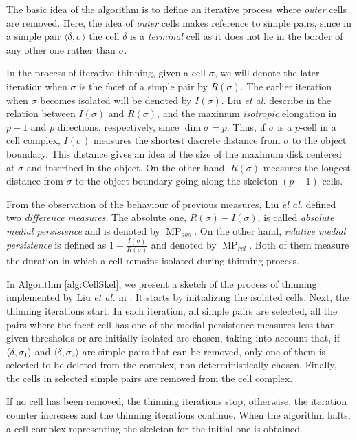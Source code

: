 \documentclass[journal]{IEEEtran}
\DeclareMathOperator{\MP}{MP}
\begin{document}
The basic idea of the algorithm is to define an iterative process where {\it
outer} cells are removed. Here, the idea of {\it outer} cells makes reference to
simple pairs, since in a simple pair $\langle \delta, \sigma \rangle$ the cell
$\delta$ is a {\it terminal} cell as it does not lie in the border of any other
one rather than $\sigma$.

In the process of iterative thinning, given a cell $\sigma$, we will denote the
later iteration when $\sigma$ is the facet of a simple pair by $R(\sigma)$. The
earlier iteration when $\sigma$ becomes isolated will be denoted by $I(\sigma)$.
Liu \emph{et al.} describe in \cite{DBLP:journals/cgf/LiuCLJ10} the relation
between $I(\sigma)$ and $R(\sigma)$, and the maximum \emph{isotropic} elongation
in $p+1$ and $p$ directions, respectively, since $\dim \sigma = p$. Thus, if
$\sigma$ is a $p$-cell in a cell complex, $I(\sigma)$ measures the shortest
discrete distance from $\sigma$ to the object boundary. This distance gives an
idea of the size of the maximum disk centered at $\sigma$ and inscribed in the
object. On the other hand, $R(\sigma)$ measures the longest distance from
$\sigma$ to the object boundary going along the skeleton $(p-1)$-cells.

From the observation of the behaviour of previous measures, Liu {\it el al.}
defined two \emph{difference measures}. The absolute one, $R(\sigma)-I(\sigma)$,
is called \emph{absolute medial persistence} and is denoted by $\MP_{abs}$. On
the other hand, \emph{relative medial persistence} is defined as
$1-\frac{I(\sigma)}{R(\sigma)}$ and denoted by $\MP_{rel}$. Both of them measure
the duration in which a cell remains isolated during thinning process.

In Algorithm \ref{alg:CellSkel}, we present a sketch of the process of thinning implemented by Liu \emph{et al.} in \cite{liu20093d}. It starts by initializing the isolated cells. Next, the thinning
iterations start. In each iteration, all simple pairs are selected, all the
pairs where the facet cell has one of the medial persistence measures less than
given thresholds or are initially isolated are chosen, taking into account that, if 
$\langle \delta, \sigma_1\rangle$ and $\langle \delta, \sigma_2 \rangle$ are simple 
pairs that can be removed, only one of them is selected to be deleted from the complex, 
non-deterministically chosen. Finally, the cells in
selected simple pairs are removed from the cell complex.

If no cell has been removed, the thinning iterations stop,
otherwise, the iteration counter increases and the thinning
iterations continue. When the algorithm halts, a cell complex
representing the skeleton for the initial one is obtained.
\end{document}
